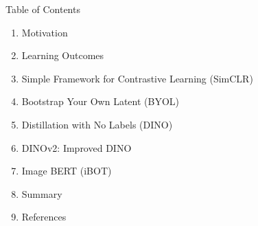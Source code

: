 \begin{frame}[allowframebreaks]{Table of Contents}
\begin{enumerate}
    \item Motivation
    \item Learning Outcomes
    \item Simple Framework for Contrastive Learning (SimCLR)
    \item Bootstrap Your Own Latent (BYOL)
    \item Distillation with No Labels (DINO)
    \item DINOv2: Improved DINO
    \item Image BERT (iBOT)
    \item Summary
    \item References
\end{enumerate}
\end{frame}
